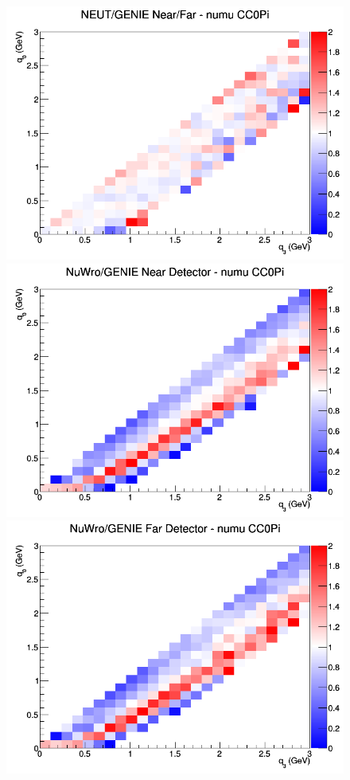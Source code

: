 \documentclass[12pt]{article}
\begin{document}
\begin{figure}[h]
\endminipage
{}
\includegraphics[width=\linewidth]{q0_q3/nominal/ratios/CC0Pi_NEUT_GENIE_numu_NF_q3_q0.png}
\endminipage
\newline
{}
\includegraphics[width=\linewidth]{q0_q3/nominal/ratios/CC0Pi_NuWro_GENIE_numu_near_q3_q0.png}
\endminipage
{}
\includegraphics[width=\linewidth]{q0_q3/nominal/ratios/CC0Pi_NuWro_GENIE_numu_far_q3_q0.png}

\end{figure}
\end{document}
